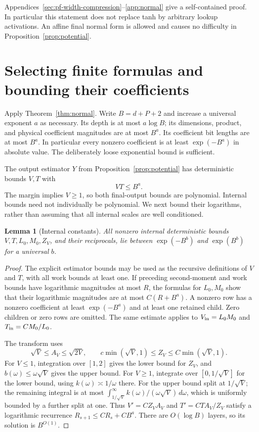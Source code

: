 \documentclass[11pt]{article}
\newtheorem{lemma}[theorem]{Lemma}
\theoremstyle{remark}\newtheorem{remark}[theorem]{Remark}
\begin{document}
Appendices~\ref{sec:pf-width-compression}--\ref{app:normal} give a
self-contained proof. In particular this statement does not replace
tanh by arbitrary lookup activations. An affine final normal form is
allowed and causes no difficulty in Proposition~\ref{prop:potential}.

\section{Selecting finite formulas and bounding their coefficients}
\label{sec:precision}

Apply Theorem~\ref{thm:normal}. Write $B=d+P+2$ and increase a
universal exponent $a$ as necessary. Its depth is at most $a\log B$;
its dimensions, product, and physical coefficient magnitudes are at
most $B^a$. Its coefficient bit lengths are at most $B^a$. In
particular every nonzero coefficient is at least $\exp(-B^a)$ in
absolute value. The deliberately loose exponential bound is sufficient.

The output estimator $Y$ from Proposition~\ref{prop:potential} has
deterministic bounds $V,T$ with
\begin{equation}\label{eq:VT}
 VT\le B^a.
\end{equation}
The margin implies $V\ge1$, so both final-output bounds are polynomial.
Internal bounds need not individually be polynomial. We next bound
their logarithms, rather than assuming that all internal scales are
well conditioned.

\begin{lemma}[Internal constants]
\label{lem:constants}
All nonzero internal deterministic bounds $V,T,L_0,M_0,Z_V$, and their
reciprocals, lie between $\exp(-B^b)$ and $\exp(B^b)$ for a
universal $b$.
\end{lemma}
\begin{proof}
The explicit estimator bounds may be used as the recursive definitions
of $V$ and $T$, with all work bounds at least one. If preceding
second-moment and work bounds have logarithmic magnitudes at most
$R$, the formulas for $L_0,M_0$ show that their logarithmic
magnitudes are at most $C(R+B^a)$. A nonzero row has a nonzero
coefficient at least $\exp(-B^a)$ and at least one retained child.
Zero children or zero rows are omitted. The same estimate applies to
$V_{\rm in}=L_0M_0$ and $T_{\rm in}=CM_0/L_0$.

The transform uses
\begin{equation}\label{eq:Zbounds}
 \sqrt V\le A_V\le\sqrt{2V},\qquad
 c\min(\sqrt V,1)\le Z_V\le C\min(\sqrt V,1).
\end{equation}
For $V\le1$, integration over $[1,2]$ gives the lower bound for
$Z_V$, and $b(\omega)\le\omega\sqrt V$ gives the upper bound.
For $V\ge1$, integrate over $[0,1/\sqrt V]$ for the lower bound,
using $k(\omega)\asymp1/\omega$ there. For the upper bound split
at $1/\sqrt V$; the remaining integral is at most
$\int_{1/\sqrt V}^\infty k(\omega)/(\omega\sqrt V)\,d\omega$,
which is uniformly bounded by a further split at one. Thus
$V'=CZ_VA_V$ and $T'=CT A_V/Z_V$ satisfy a logarithmic recurrence
$R_{s+1}\le CR_s+CB^a$. There are $O(\log B)$ layers, so its
solution is $B^{O(1)}$.
\end{proof}
\end{document}
